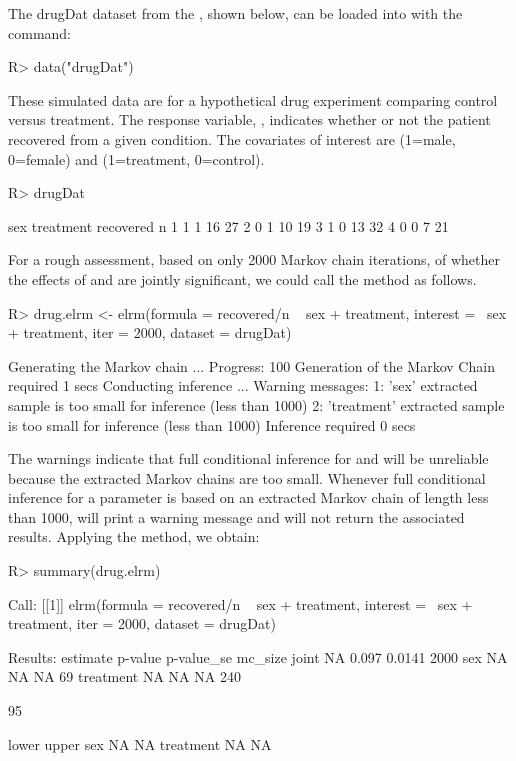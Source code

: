 \documentclass[article, shortnames]{jss}
\begin{document}
The drugDat dataset from the , shown below,
can be loaded into  with the
command:
\begin{CodeInput}
R> data("drugDat")
\end{CodeInput}
These simulated data are for a hypothetical drug experiment
comparing control versus treatment. The response variable,
, indicates whether or not the patient recovered
from a given condition. The covariates of interest are 
(1=male, 0=female) and  (1=treatment, 0=control).
\begin{CodeChunk}
\begin{CodeInput}
R> drugDat
\end{CodeInput}
\begin{CodeOutput}
  sex treatment recovered  n
1   1         1        16 27
2   0         1        10 19
3   1         0        13 32
4   0         0         7 21
\end{CodeOutput}
\end{CodeChunk}
For a rough assessment, based on only 2000 Markov chain
iterations, of whether the effects of  and
 are jointly significant, we could call the
 method as follows.
\begin{CodeChunk}
\begin{CodeInput}
R> drug.elrm <- elrm(formula = recovered/n ~ sex + treatment,
interest = ~sex + treatment, iter = 2000, dataset = drugDat)
\end{CodeInput}
\begin{CodeOutput}
Generating the Markov chain ...
Progress: 100%
Generation of the Markov Chain required 1 secs
Conducting inference ...
Warning messages:
1: 'sex' extracted sample is too small for inference (less than 1000)
2: 'treatment' extracted sample is too small for inference (less than 1000)
Inference required 0 secs
\end{CodeOutput}
\end{CodeChunk}
The warnings indicate that full conditional inference for
 and  will be unreliable because the
extracted Markov chains are too small. Whenever full conditional
inference for a parameter is based on an extracted Markov chain of
length less than 1000,  will print a warning message and
will not return the associated results. Applying the
 method, we obtain:
\begin{CodeChunk}
\begin{CodeInput}
R> summary(drug.elrm)
\end{CodeInput}
\begin{CodeOutput}
Call:
[[1]]
elrm(formula = recovered/n ~ sex + treatment,
     interest = ~sex + treatment, iter = 2000,
     dataset = drugDat)

Results:
          estimate p-value p-value_se mc_size
joint           NA   0.097     0.0141    2000
sex             NA      NA         NA      69
treatment       NA      NA         NA     240

95%

          lower upper
sex          NA    NA
treatment    NA    NA
\end{CodeOutput}
\end{CodeChunk}
\end{document}
